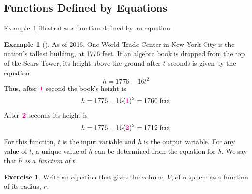 \documentclass[10pt,]{book}
\theoremstyle{plain}
\theoremstyle{definition}
\theoremstyle{definition}
\newtheorem{example}[theorem]{Example}
\theoremstyle{definition}
\newtheorem{exercise}[theorem]{Exercise}
\newcommand{\alert}[1]{\boldsymbol{\color{magenta}{#1}}}
\begin{document}
\subsection[{Functions Defined by Equations}]{Functions Defined by Equations}\label{subsection-4}
\hyperref[example-falling-book]{Example~\ref{example-falling-book}} illustrates a function defined by an equation.%
\begin{example}[]\label{example-falling-book}
As of 2016,  One World Trade Center in New York City is the nation’s tallest building, at 1776 feet. If an algebra book is dropped from the top of the Sears Tower, its height above the ground after \(t\) seconds is given by the equation%
\begin{equation*}
h = 1776 - 16t^2
\end{equation*}
Thus, after \(\alert{1}\) second the book’s height is%
\begin{equation*}
h = 1776 - 16(\alert{1})^2 = 1760 \text{ feet}
\end{equation*}
After \(\alert{2}\) seconds its height is%
\begin{equation*}
h = 1776 - 16(\alert{2})^2 = 1712 \text{ feet}
\end{equation*}
For this function, \(t\) is the input variable and \(h\) is the output variable. For any value of \(t\), a unique value of \(h\) can be determined from the equation for \(h\). We say that \(h\) \emph{is a function of} \(t\).%
\end{example}
\begin{exercise}\label{exercise-4}
Write an equation that gives the volume, \(V\), of a sphere as a function of its radius, \(r\).\end{exercise}
\end{document}

